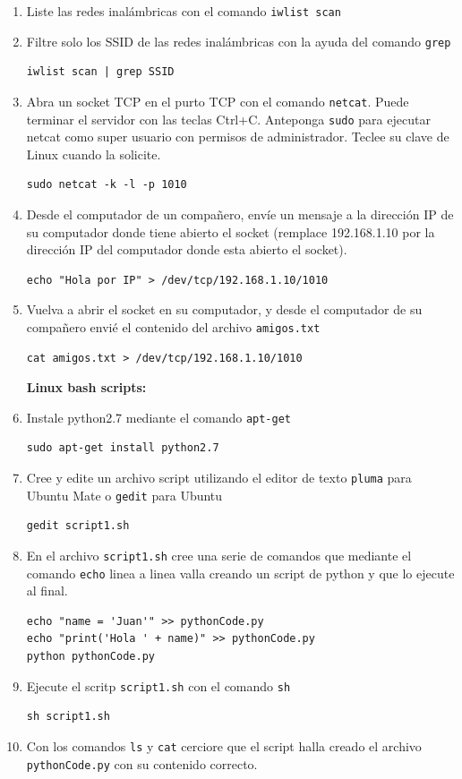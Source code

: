 \documentclass[10pt,letterpaper]{article}
\begin{document}
\begin{enumerate}
\item Liste las redes inalámbricas con el comando \verb|iwlist scan|

\item Filtre solo los SSID de las redes inalámbricas con la ayuda del comando \verb|grep|
\begin{verbatim}
iwlist scan | grep SSID
\end{verbatim}

\item Abra un socket TCP en el purto TCP con el comando \verb|netcat|. Puede terminar el servidor con las teclas Ctrl+C. Anteponga \verb|sudo| para ejecutar netcat como super usuario con permisos de administrador. Teclee su clave de Linux cuando la solicite. 
\begin{verbatim}
sudo netcat -k -l -p 1010
\end{verbatim}

\item Desde el computador de un compañero, envíe un mensaje a la dirección IP de su computador donde tiene abierto el socket (remplace 192.168.1.10 por la dirección IP del computador donde esta abierto el socket).
\begin{verbatim}
echo "Hola por IP" > /dev/tcp/192.168.1.10/1010
\end{verbatim}

\item Vuelva a abrir el socket en su computador, y desde el computador de su compañero envié el contenido del archivo \verb|amigos.txt|
\begin{verbatim}
cat amigos.txt > /dev/tcp/192.168.1.10/1010
\end{verbatim}


\textbf{Linux bash scripts:}

\item Instale python2.7 mediante el comando \verb|apt-get|
\begin{verbatim}
sudo apt-get install python2.7
\end{verbatim}

\item Cree y edite un archivo script utilizando el editor de texto \verb|pluma| para Ubuntu Mate o \verb|gedit| para Ubuntu
\begin{verbatim}
gedit script1.sh
\end{verbatim}

\item En el archivo \verb|script1.sh| cree una serie de comandos que mediante el comando \verb|echo| linea a linea valla creando un script de python y que lo ejecute al final.
\begin{verbatim}
echo "name = 'Juan'" >> pythonCode.py
echo "print('Hola ' + name)" >> pythonCode.py
python pythonCode.py
\end{verbatim}

\item Ejecute el scritp \verb|script1.sh| con el comando \verb|sh|
\begin{verbatim}
sh script1.sh
\end{verbatim}

\item Con los comandos \verb|ls| y \verb|cat| cerciore que el script halla creado el archivo \verb|pythonCode.py| con su contenido correcto. 




\end{enumerate}
\end{document}
